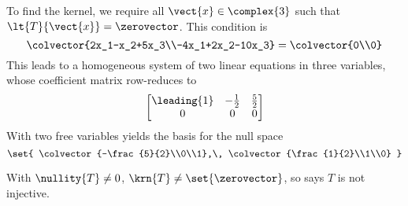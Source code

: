 To find the kernel, we require all $\vect{x}\in\complex{3}$ such that $\lt{T}{\vect{x}}=\zerovector$.  This condition is
%
\begin{equation*}
\colvector{2x_1-x_2+5x_3\\-4x_1+2x_2-10x_3}=\colvector{0\\0}
\end{equation*}
%
This leads to a homogeneous system of two linear equations in three variables, whose coefficient matrix row-reduces to
%
\begin{equation*}
\begin{bmatrix}
\leading{1} & -\frac{1}{2} & \frac{5}{2}\\
0 & 0 & 0
\end{bmatrix}
\end{equation*}
%
With two free variables  yields the basis for the null space
%
\begin{equation*}
\set{
\colvector{-\frac{5}{2}\\0\\1},\,
\colvector{\frac{1}{2}\\1\\0}
}
\end{equation*}
\par
%
With $\nullity{T}\neq 0$, $\krn{T}\neq\set{\zerovector}$, so  says $T$ is not injective.
